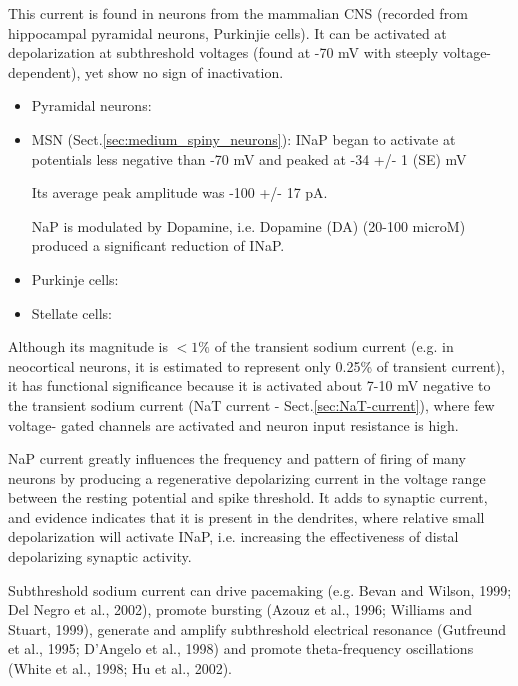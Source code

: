 This current is found in neurons from the mammalian CNS (recorded from
hippocampal pyramidal neurons, Purkinjie cells). It can be activated at
depolarization at subthreshold voltages (found at -70 mV with steeply
voltage-dependent), yet show no sign of inactivation.
\begin{itemize}
  \item Pyramidal neurons:
  
  \item MSN (Sect.\ref{sec:medium_spiny_neurons}): INaP began to activate at
  potentials less negative than -70 mV and peaked at -34 +/- 1 (SE) mV

  Its average peak amplitude was -100 +/- 17 pA.
  
  NaP is modulated by Dopamine, i.e. Dopamine (DA) (20-100 microM) produced a
  significant reduction of INaP.
  
  \item Purkinje cells:  
  
  \item Stellate cells:
  \label{sec:Magistretti-Alonso-1999}
  
  
\end{itemize}

Although its magnitude is $< 1\%$ of the transient sodium current (e.g. in
neocortical neurons, it is estimated to represent only 0.25\% of transient
current), it has functional significance because it is activated about 7-10 mV
negative to the transient sodium current (NaT current -
Sect.\ref{sec:NaT-current}), where few voltage- gated channels are activated and
neuron input resistance is high.

\begin{mdframed}
NaP current greatly influences the frequency and pattern of firing of many
neurons by producing a regenerative depolarizing current in the voltage range between the
resting potential and spike threshold. It adds to synaptic current, and evidence
indicates that  it  is  present in the dendrites, where relative small
depolarization will activate INaP, i.e. increasing the effectiveness of distal
depolarizing synaptic activity.

Subthreshold sodium current can drive pacemaking (e.g. Bevan and Wilson, 1999;
Del Negro et al., 2002), promote bursting (Azouz et al., 1996; Williams and
Stuart, 1999), generate and amplify subthreshold electrical resonance (Gutfreund
et al., 1995; D'Angelo et al., 1998) and promote theta-frequency oscillations
(White et al., 1998; Hu et al., 2002).

\end{mdframed}


